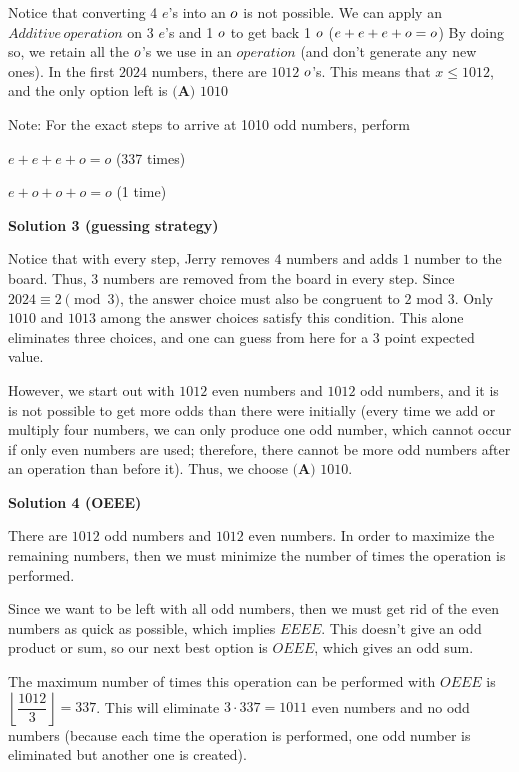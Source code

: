 \begin{enumerate}
 Notice that converting 4 $e$'s into an $\normalsize o$ is not possible. We can apply an $Additive \, operation$ on 3 $e$'s and 1 $\normalsize o$ to get back 1 $\normalsize o$ ($e+e+e+\normalsize o=\normalsize o$) By doing so, we retain all the $\normalsize o$'s we use in an $operation$ (and don't generate any new ones). In the first $2024$ numbers, there are $1012$ $\normalsize o$'s. This means that $x \le 1012$, and the only option left is $\boxed{\textbf{(A) } 1010}$

 
Note: For the exact steps to arrive at 1010 odd numbers, perform

 $e+e+e+o=o$ (337 times)

 $e+o+o+o=o$ (1 time)

 



\textbf{Solution 3 (guessing strategy)}

Notice that with every step, Jerry removes $4$ numbers and adds $1$ number to the board. Thus, $3$ numbers are removed from the board in every step. Since $2024\equiv2\pmod{3}$, the answer choice must also be congruent to $2$ mod $3$. Only $1010$ and $1013$ among the answer choices satisfy this condition. This alone eliminates three choices, and one can guess from here for a 3 point expected value. 

 However, we start out with $1012$ even numbers and $1012$ odd numbers, and it is is not possible to get more odds than there were initially (every time we add or multiply four numbers, we can only produce one odd number, which cannot occur if only even numbers are used; therefore, there cannot be more odd numbers after an operation than before it). Thus, we choose $\boxed{\textbf{(A) } 1010.}$




\textbf{Solution 4 (OEEE)}

There are $1012$ odd numbers and $1012$ even numbers. In order to maximize the remaining numbers, then we must minimize the number of times the operation is performed.

 Since we want to be left with all odd numbers, then we must get rid of the even numbers as quick as possible, which implies $EEEE$. This doesn't give an odd product or sum, so our next best option is $OEEE$, which gives an odd sum. 

 The maximum number of times this operation can be performed with $OEEE$ is $\left\lfloor{\dfrac{1012}{3}}\right\rfloor=337$. This will eliminate $3\cdot337=1011$ even numbers and no odd numbers (because each time the operation is performed, one odd number is eliminated but another one is created). 


\end{enumerate}
